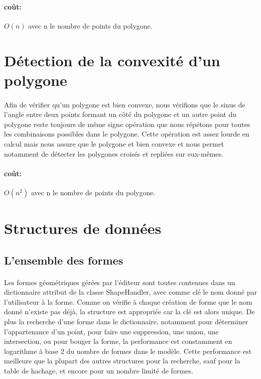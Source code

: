 \documentclass[a4paper, 12pts]{article}
\begin{document}
\paragraph{coût: }
\(O(n)\) avec n le nombre de points du polygone.

\section{Détection de la convexité d'un polygone}
\paragraph{}
Afin de vérifier qu'un polygone est bien convexe, nous vérifions que le sinus de l'angle entre deux points formant un côté du polygone et un autre point du polygone reste toujours de même signe opération que nous répétons pour toutes les combinaisons possibles dans le polygone. Cette opération est assez lourde en calcul mais nous assure que le polygone et bien convexe et nous permet notamment de détecter les polygones croisés et repliées sur eux-mêmes.
\paragraph{coût: }
\(O(n^2)\) avec n le nombre de points du polygone.

\section{Structures de données}

\subsection{L'ensemble des formes}
\paragraph{}
Les formes géométriques gérées par l'éditeur sont toutes contenues dans un dictionnaire attribut de la classe ShapeHandler, avec comme clé le nom donné par l'utilisateur à la forme. Comme on vérifie à chaque création de forme que le nom donné n'existe pas déjà, la structure est appropriée car la clé est alors unique. De plus la recherche d'une forme dans le dictionnaire, notamment pour déterminer l'appartenance d'un point, pour faire une suppression, une union, une intersection, ou pour bouger la forme, la performance est constamment en logarithme à base 2 du nombre de formes dans le modèle. Cette performance est meilleure que la plupart des autres structures pour la recherche, sauf pour la table de hachage, et encore pour un nombre limité de formes.
\end{document}
